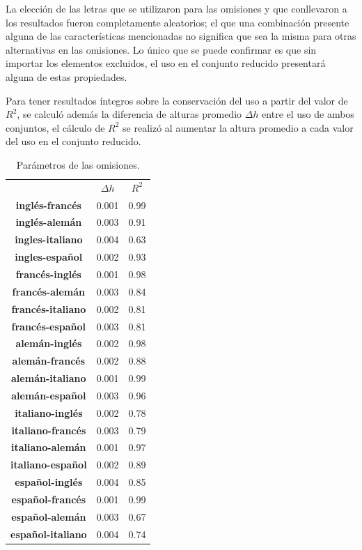 La elección de las letras que se utilizaron para las omisiones y que conllevaron a los resultados fueron completamente aleatorios;  el que una combinación presente alguna de las características mencionadas no significa que sea la misma para otras alternativas en las omisiones. Lo único que se puede confirmar es que sin importar los elementos excluidos, el uso en el conjunto reducido presentará alguna de estas propiedades. 

Para tener resultados íntegros sobre la conservación del uso a partir del valor de $R^{2}$,  se calculó además la diferencia de alturas  promedio $\Delta h$ entre el uso de ambos conjuntos, el cálculo  de $R^{2}$ se realizó al aumentar la altura promedio a cada valor del uso en el conjunto reducido.


\begin{table}[h!]
	\centering
	\begin{tabular}{ccc}
		\textbf{}  & \textbf{$\Delta h$}  & \textbf{$R^{2}$}      \\
		\textbf{inglés-francés}    & 0.001           & 0.99       \\
		\textbf{inglés-alemán}     & 0.003           & 0.91       \\
		\textbf{ingles-italiano}   & 0.004           & 0.63       \\
		\textbf{ingles-español}    & 0.002           & 0.93       \\
		\textbf{francés-inglés}    & 0.001           & 0.98       \\    
		\textbf{francés-alemán}    & 0.003           & 0.84       \\ 
		\textbf{francés-italiano}  & 0.002           & 0.81       \\ 
		\textbf{francés-español}   & 0.003           & 0.81       \\ 
		\textbf{alemán-inglés}     & 0.002           & 0.98       \\
		\textbf{alemán-francés}    & 0.002           & 0.88       \\
		\textbf{alemán-italiano}   & 0.001           & 0.99       \\
		\textbf{alemán-español}    & 0.003           & 0.96       \\
		\textbf{italiano-inglés}   & 0.002           & 0.78       \\
		\textbf{italiano-francés}  & 0.003           & 0.79       \\
		\textbf{italiano-alemán}   & 0.001           & 0.97       \\
		\textbf{italiano-español}  & 0.002           & 0.89       \\
		\textbf{español-inglés}    & 0.004           & 0.85       \\
		\textbf{español-francés}   & 0.001           & 0.99       \\
		\textbf{español-alemán}    & 0.003           & 0.67       \\
		\textbf{español-italiano}  & 0.004           & 0.74       
	\end{tabular}
	\caption{Parámetros de las omisiones.}
	\label{tab.Omision}
\end{table}


